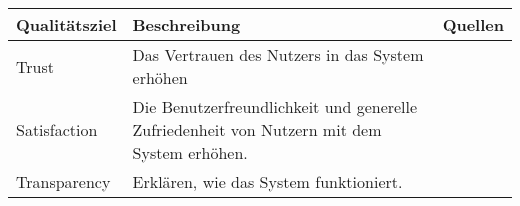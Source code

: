 \begin{table}[htb!]
    \begin{center}
        \begin{tabular}{|p{}|p{}|p{}|}
            \hline
            \textbf{Qualitätsziel}    & \textbf{Beschreibung} & \textbf{Quellen} \\ \hline
            Trust                       & Das Vertrauen des Nutzers in das System erhöhen \cite[vgl.][]{balog_measuring_2020}
                                        & \cite{nunes_systematic_2017} \cite{chazette_knowledge_nodate} \cite{tintarev_designing_nodate} \cite{balog_measuring_2020} \cite{eiband_impact_2019} \cite{tintarev2015explaining} \cite{hernandez-bocanegra_effects_2020} \cite{stange_effects_2021} \cite{weitz_you_2019} \cite{yamada_evaluating_2016} \cite{haspiel_explanations_2018} \cite{martin_developing_2019} \cite{martin_evaluating_2021} \cite{tsai_effects_2020}  \cite{sokol_one_2020}  \cite{wang_is_2018} \cite{koo_understanding_2016} \cite{wiegand2019drive} \cite{gunning2019darpa} \cite{lim_2009_assessing} \cite{tintarev2007survey} \cite{kunkel_let_2019} \\ \hline
            Satisfaction                & Die Benutzerfreundlichkeit und generelle Zufriedenheit von Nutzern mit dem System erhöhen. \cite[vgl.][]{balog_measuring_2020}
                                        & \cite{nunes_systematic_2017} \cite{chazette_knowledge_nodate} \cite{tintarev_designing_nodate} \cite{balog_measuring_2020} \cite{tsai_evaluating_2019} \cite{tintarev2015explaining} \cite{riveiro_thats_2021} \cite{martin_developing_2019} \cite{martin_evaluating_2021} \cite{tsai_effects_2020} \cite{ehsan_human-centered_2020} \cite{sovrano_modelling_2020} \cite{koo_understanding_2016} \cite{ribera2019can} \cite{gunning2019darpa} \cite{lim_2009_assessing}  \cite{tintarev2007survey} \cite{sato_context_nodate} \\ \hline
            Transparency                & Erklären, wie das System funktioniert. \cite[vgl.][]{balog_measuring_2020}
                                        & \cite{nunes_systematic_2017} \cite{chazette_knowledge_nodate} \cite{tintarev_designing_nodate} \cite{chazette_end-users_nodate} \cite{balog_measuring_2020} \cite{chazette2020explainability} \cite{tintarev2015explaining} \cite{hernandez-bocanegra_effects_2020} \cite{tsai_effects_2020} \cite{rjoob_towards_2021}  \cite{sokol_one_2020} \cite{wang_is_2018} \cite{koo_understanding_2016} \cite{tintarev2007survey}\\ \hline

\end{tabular}
\end{center}
\end{table}
